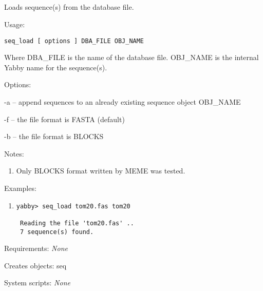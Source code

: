 


\subsection[seq\_load]{  }



Loads sequence(s) from the database file.


\begin{description}


\item{Usage:}

{\tt seq\_load [ options ] DBA\_FILE OBJ\_NAME}

Where DBA\_FILE is the name of the database file. OBJ\_NAME is
the internal Yabby name for the sequence(s).


\item{Options:}
\begin{description}
\item -a -- append sequences to an already existing sequence
object OBJ\_NAME
\item -f -- the file format is FASTA (default)
\item -b -- the file format is BLOCKS
\end{description}


\item{Notes:}
\begin{enumerate}
\item Only BLOCKS format written by MEME \cite{meme} was tested.
\end{enumerate}


\item{Examples:}
\begin{enumerate}

\item
\begin{verbatim}
yabby> seq_load tom20.fas tom20

 Reading the file 'tom20.fas' ..
 7 sequence(s) found.
\end{verbatim}

\end{enumerate}


\item{Requirements:} {\em None}


\item{Creates objects:} seq


\item{System scripts:} {\em None}

\end{description}


